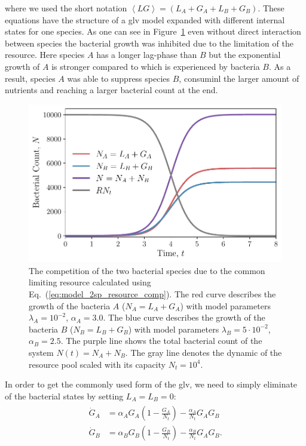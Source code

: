 \documentclass[10pt,A4paper]{article}
\numberwithin{equation}{section}
\begin{document}
where we used the short notation $\left<LG\right>=(L_A+G_A+L_B+G_B)$.
These equations have the structure of a \ac{glv} model expanded with different internal states for one species.
As one can see in Figure~\ref{fig:2pool_resource_2sp} even without direct interaction between species the bacterial growth was inhibited due to the limitation of the resource.
Here species $A$ has a longer lag-phase than $B$ but the exponential growth of $A$ is stronger compared to which is experienced by bacteria $B$.
As a result, species $A$ was able to suppress species $B$, consuminl the larger amount of nutrients and reaching a larger bacterial count at the end.
\begin{figure}
    \begin{center}
    \includegraphics[width=0.9\columnwidth]{Figures/pool_model_2pools_resource_competition.pdf}
    \caption{
        The competition of the two bacterial species due to the common limiting resource calculated using Eq.~(\ref{eq:model_2sp_resource_comp}).
        The red curve describes the growth of the bacteria $A$ ($N_A = L_A+G_A$) with model parameters $\lambda_A=10^{-2}$, $\alpha_A=3.0$.
        The blue curve describes the growth of the bacteria $B$ ($N_B = L_B+G_B$) with model parameters $\lambda_B=5\cdot 10^{-2}$, $\alpha_B=2.5$.
        The purple line shows the total bacterial count of the system  $N(t)=N_A+N_B$.
        The gray line denotes the dynamic of the resource pool scaled with its capacity $N_t=10^4$.
    }
    \label{fig:2pool_resource_2sp}
    \end{center}
\end{figure}
%
In order to get the commonly used form of the \ac{glv}, we need to simply eliminate of the bacterial states by setting $L_A=L_B=0$:
\begin{align}
    \begin{split}
        \dot{G}_A &= \alpha_A G_A\left(1 - \frac{G_A}{N_t}\right) - \frac{\alpha_A}{N_t}G_AG_B\\
        \dot{G}_B &= \alpha_B G_B\left(1-\frac{G_B}{N_t}\right) -\frac{\alpha_B}{N_t}G_AG_B. 
    \label{eq:LV_simple}
    \end{split}
\end{align}
\end{document}
